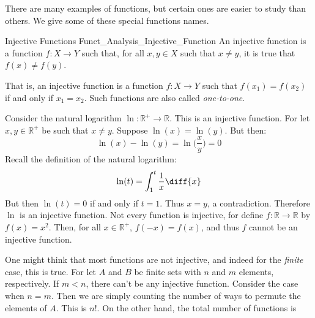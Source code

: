 \documentclass[crop=false,class=book,oneside]{standalone}
\begin{document}
            There are many examples of functions, but certain
            ones are easier to study than others. We give some
            of these special functions names.
            \begin{ldefinition}{Injective Functions}
                  {Funct_Analysis_Injective_Function}
                An \gls{injective function} is a function
                $f:X\rightarrow{Y}$ such that, for all
                $x,y\in{X}$ such that $x\ne{y}$, it is true that
                $f(x)\ne{f}(y)$.
            \end{ldefinition}
            That is, an injective function is a function
            $f:X\rightarrow{Y}$ such that $f(x_{1})=f(x_{2})$
            if and only if $x_{1}=x_{2}$. Such functions are also
            called \textit{one-to-one}.
            \begin{lexample}
                Consider the natural logarithm
                $\ln:\mathbb{R}^{+}\rightarrow\mathbb{R}$. This
                is an injective function. For let
                $x,y\in\mathbb{R}^{+}$ be such that $x\ne{y}$.
                Suppose $\ln(x)=\ln(y)$. But then:
                \begin{equation}
                    \ln(x)-\ln(y)=\ln\Big(\frac{x}{y}\Big)=0
                \end{equation}
                Recall the definition of the natural logarithm:
                \begin{equation}
                    \ln(t)=\int_{1}^{t}\frac{1}{x}\diff{x}
                \end{equation}
                But then $\ln(t)=0$ if and only if $t=1$. Thus
                $x=y$, a contradiction. Therefore $\ln$ is an
                injective function. Not every function is
                injective, for define
                $f:\mathbb{R}\rightarrow\mathbb{R}$ by
                $f(x)=x^{2}$. Then, for all $x\in\mathbb{R}^{+}$,
                $f(\minus{x})=f(x)$, and thus $f$ cannot be an
                injective function.
            \end{lexample}
            One might think that most functions are not injective,
            and indeed for the \textit{finite} case, this is true.
            For let $A$ and $B$ be finite sets with $n$ and $m$
            elements, respectively. If $m<n$, there can't be
            any injective function. Consider the case when $n=m$.
            Then we are simply counting the number of ways to
            permute the elements of $A$. This is $n!$. On the
            other hand, the total number of functions is
\end{document}
